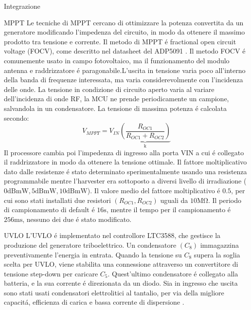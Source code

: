 \begin{section}{Integrazione}
    \begin{subsection}{MPPT}
        Le tecniche di MPPT cercano di ottimizzare la potenza convertita da un generatore modificando l'impedenza del circuito, in modo da ottenere il massimo prodotto tra tensione e corrente. Il metodo di MPPT \'e fractional open circuit voltage (FOCV), come descritto nel datasheet del ADP5091 \cite{ADP5091DatasheetProduct}. Il metodo FOCV \'e comunemente usato in campo fotovoltaico, ma il funzionamento del modulo antenna e raddrizzatore \'e paragonabile.L'uscita in tensione varia poco all'interno della banda di frequenze interessata, ma varia considerevolmente con l'incidenza delle onde. La tensione in condizione di circuito aperto varia al variare dell'incidenza di onde RF, la MCU ne prende periodicamente un campione, salvandola in un condensatore. La tensione di massima potenza \'e calcolata secondo:
        \begin{equation*}
            V_{MPPT} = V_{IN}\underbrace{\left(\frac{R_{OC1}}{R_{OC1}+R_{OC2}}\right)}_\mathrm{k}
         \end{equation*}
        Il processore cambia poi l'impedenza di ingresso alla porta VIN a cui \'e collegato il raddrizzatore in modo da ottenere la tensione ottimale. Il fattore moltiplicativo dato dalle resistenze \'e stato determinato sperimentalmente usando una resistenza programmabile mentre l'harvester era sottoposto a diversi livello di irradiazione (\(0\mathrm{dBmW},5\mathrm{dBmW},10\mathrm{dBmW}\)). Il valore medio del fattore moltiplicativo \'e \(0.5\), per cui sono stati installati due resistori \((R_{OC1},R_{OC2})\) uguali da \(10\mathrm{M\Omega}\). Il periodo di campionamento di default \'e \(16\mathrm{s}\), mentre il tempo per il campionamento \'e \(256\mathrm{ms}\), nessuno dei due \'e stato modificato.
    \end{subsection}

    \begin{subsection}{UVLO}
        L'UVLO \'e implementato nel controllore LTC3588, che gestisce la produzione del generatore triboelettrico. Un condensatore \((C_8)\) immagazzina preventivamente l'energia in entrata. Quando la tensione su  \(C_8\) supera la soglia scelta per UVLO, viene stabilita una connessione attraverso un convertitore di tensione step-down per caricare \(C_5\). Quest'ultimo condensatore \'e collegato alla batteria, e la sua corrente \'e direzionata da un diodo. Sia in ingresso che uscita sono stati usati condensatori elettrolitici al tantalio, per via della migliore capacit\'a, efficienza di carica e bassa corrente di dispersione \cite{torkiElectrolyticCapacitorProperties2023}.
    \end{subsection}


\end{section}
